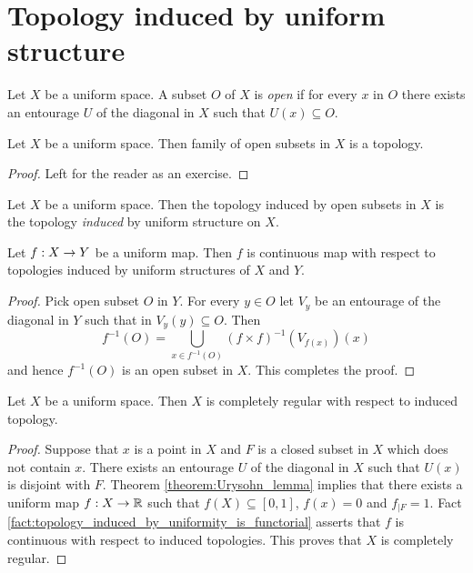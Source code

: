\documentclass[10pt]{amsart}
\begin{document}
\section{Topology induced by uniform structure}

\begin{definition}
	Let $X$ be a uniform space. A subset $O$ of $X$ is \textit{open} if for every $x$ in $O$ there exists an entourage $U$ of the diagonal in $X$ such that $U(x) \subseteq O$.
\end{definition}

\begin{fact}\label{fact:topology_induced_by_uniform_structure}
	Let $X$ be a uniform space. Then family of open subsets in $X$ is a topology.
\end{fact}
\begin{proof}
	Left for the reader as an exercise.
\end{proof}

\begin{definition}
	Let $X$ be a uniform space. Then the topology induced by open subsets in $X$ is the topology \textit{induced} by uniform structure on $X$.
\end{definition}

\begin{fact}\label{fact:topology_induced_by_uniformity_is_functorial}
	Let $f:X \rightarrow Y$ be a uniform map. Then $f$ is continuous map with respect to topologies induced by uniform structures of $X$ and $Y$.
\end{fact}
\begin{proof}
	Pick open subset $O$ in $Y$. For every $y \in O$ let $V_y$ be an entourage of the diagonal in $Y$ such that in $V_y(y) \subseteq O$. Then
	$$f^{-1}(O) = \bigcup_{x \in f^{-1}(O)}\left(f\times f\right)^{-1}(V_{f(x)})\left(x\right)$$
	and hence $f^{-1}(O)$ is an open subset in $X$. This completes the proof.
\end{proof}

\begin{corollary}\label{corollary:uniform_spaces_are_completely_regular}
	Let $X$ be a uniform space. Then $X$ is completely regular with respect to induced topology.
\end{corollary}
\begin{proof}
	Suppose that $x$ is a point in $X$ and $F$ is a closed subset in $X$ which does not contain $x$. There exists an entourage $U$ of the diagonal in $X$ such that $U(x)$ is disjoint with $F$. Theorem \ref{theorem:Urysohn_lemma} implies that there exists a uniform map $f:X\rightarrow {\mathbb R}$ such that $f(X) \subseteq [0,1]$, $f(x) = 0$ and $f_{\mid F} = 1$. Fact \ref{fact:topology_induced_by_uniformity_is_functorial} asserts that $f$ is continuous with respect to induced topologies. This proves that $X$ is completely regular.
\end{proof}
\end{document}
